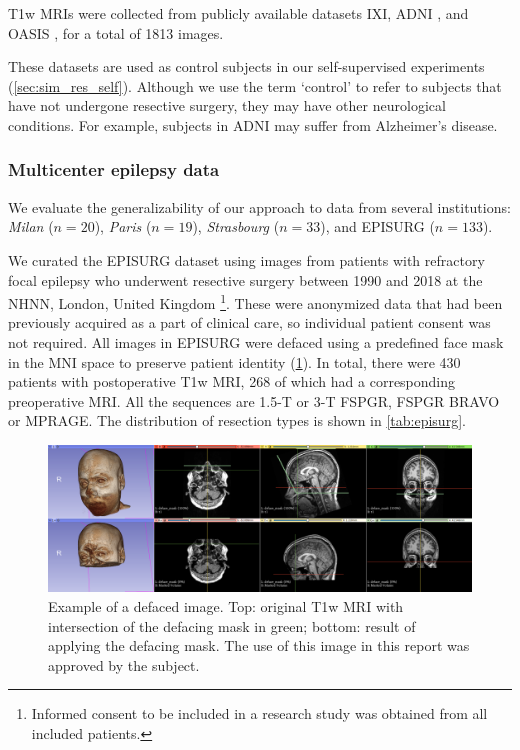 \ac{T1w} \acp{MRI} were collected from publicly available datasets \ac{IXI}, \ac{ADNI} \cite{jack_alzheimers_2008}, and \ac{OASIS} \cite{lamontagne_oasis-3_2019}, for a total of 1813 images.

These datasets are used as control subjects in our self-supervised experiments (\cref{sec:sim_res_self}).
Although we use the term `control' to refer to subjects that have not undergone resective surgery, they may have other neurological conditions.
For example, subjects in \ac{ADNI} may suffer from Alzheimer's disease.


\subsubsection{Multicenter epilepsy data}
\label{sec:multicenter}

We evaluate the generalizability of our approach to data from several institutions: \textit{Milan} ($n = 20$), \textit{Paris} ($n = 19$), \textit{Strasbourg} ($n = 33$), and EPISURG ($n = 133$).

We curated the EPISURG dataset using images from patients with refractory focal epilepsy who underwent resective surgery between 1990 and 2018 at the \ac{NHNN}, London, United Kingdom%
\footnote{Informed consent to be included in a research study was obtained from all included patients.}.
These were anonymized data that had been previously acquired as a part of clinical care, so individual patient consent was not required.
All images in EPISURG were defaced using a predefined face mask in the \ac{MNI} space to preserve patient identity (\cref{fig:defacing}).
In total, there were 430 patients with postoperative \ac{T1w} \ac{MRI}, 268 of which had a corresponding preoperative \ac{MRI}.
All the sequences are 1.5-T or 3-T \ac{FSPGR}, \ac{FSPGR} \ac{BRAVO} or \ac{MPRAGE}.
The distribution of resection types is shown in \cref{tab:episurg}.

\begin{figure}
  \centering
  \includegraphics[width=\linewidth]{figures/defacing}
  \caption[Example of a defaced image]{
    Example of a defaced image.
    Top: original \ac{T1w} \ac{MRI} with intersection of the defacing mask in green;
    bottom: result of applying the defacing mask.
    The use of this image in this report was approved by the subject.}
  \label{fig:defacing}
\end{figure}


